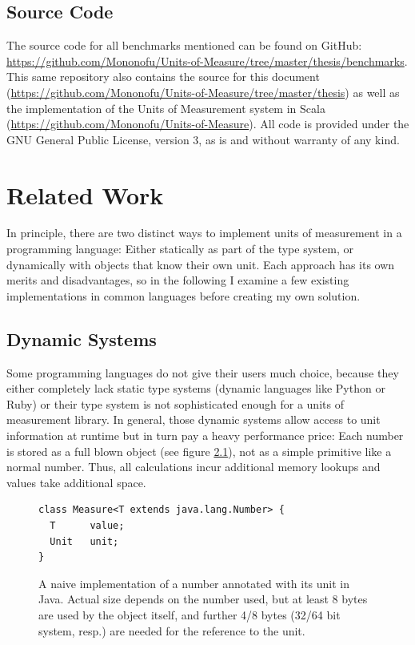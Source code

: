 \documentclass[12pt,oneside,a4paper]{scrbook}
\begin{document}
\section{Source Code}
The source code for all benchmarks mentioned can be found on GitHub: \url{https://github.com/Mononofu/Units-of-Measure/tree/master/thesis/benchmarks}. This same repository also contains the source for this document (\url{https://github.com/Mononofu/Units-of-Measure/tree/master/thesis}) as well as the implementation of the Units of Measurement system in Scala (\url{https://github.com/Mononofu/Units-of-Measure}). All code is provided under the GNU General Public License, version 3, as is and without warranty of any kind.

\chapter{Related Work}

In principle, there are two distinct ways to implement units of measurement in a programming language: Either statically as part of the type system, or dynamically with objects that know their own unit. Each approach has its own merits and disadvantages, so in the following I examine a few existing implementations in common languages before creating my own solution.

\section{Dynamic Systems}

Some programming languages do not give their users much choice, because they either completely lack static type systems (dynamic languages like Python or Ruby) or their type system is not sophisticated enough for a units of measurement library. In general, those dynamic systems allow access to unit information at runtime but in turn pay a heavy performance price: Each number is stored as a full blown object (see figure \ref{code:naive_java_measure}), not as a simple primitive like a normal number. Thus, all calculations incur additional memory lookups and values take additional space.

\begin{figure}
\begin{verbatim}
class Measure<T extends java.lang.Number> {
  T      value;
  Unit   unit;
}
\end{verbatim}
\caption{A naive implementation of a number annotated with its unit in Java. Actual size depends on the number used, but at least 8 bytes are used by the object itself, and further 4/8 bytes (32/64 bit system, resp.) are needed for the reference to the unit.}
\label{code:naive_java_measure}
\end{figure}
\end{document}
